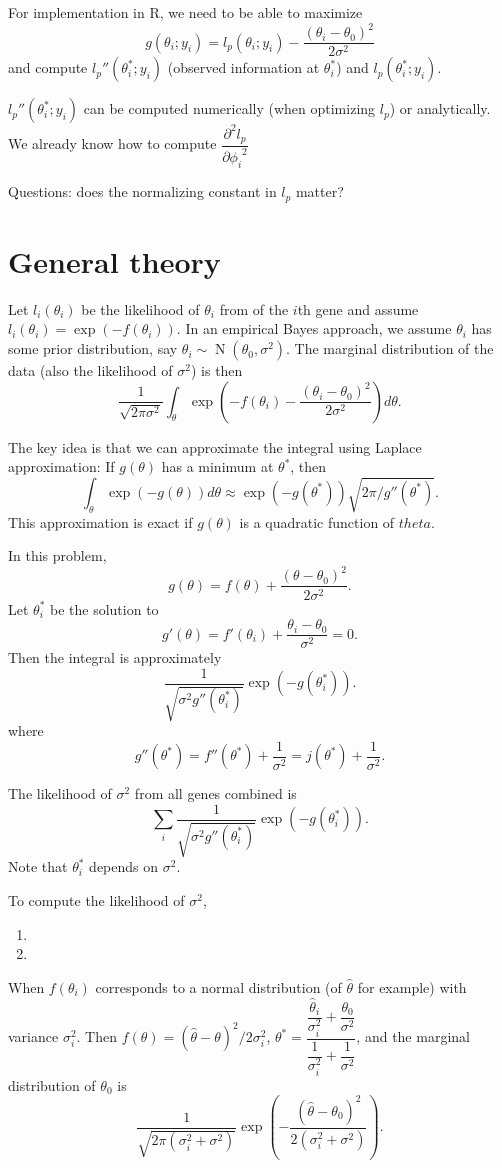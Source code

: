 \documentclass[letterpaper, 12pt]{article}
\DeclareMathOperator{\N}{N}
\newcommand{\ddpp}[2]{ \dfrac{\partial^2 #1}{ {\partial #2}^2}}
\begin{document}
For implementation in R, we need to be able to maximize
\[ g(\theta_i; y_i) = l_p(\theta_i; y_i) - \dfrac{(\theta_i - \theta_0)^2}{2 \sigma^2} \]
and compute $l_p''(\theta_i^*; y_i)$ (observed information at $\theta_i^*$) and
$l_p(\theta_i^*; y_i)$.

$l_p''(\theta_i^*; y_i)$ can be computed numerically (when optimizing $l_p$)
or analytically.  We already know how to compute $\ddpp{l_p}{\phi_i}$

Questions: does the normalizing constant in $l_p$ matter?


\newpage
\section*{General theory}
Let $l_i(\theta_i)$ be the likelihood of $\theta_i$ from of the $i$th gene and
assume $l_i(\theta_i) = \exp(-f(\theta_i))$. In an empirical Bayes approach,
we assume $\theta_i$ has some prior distribution, say $\theta_i \sim
\N(\theta_0, \sigma^2)$. The marginal distribution of the data (also the
likelihood of $\sigma^2$) is then \[ \dfrac{1}{ \sqrt{2 \pi
\sigma^2}}\int_\theta \exp\left(-f(\theta_i) - \dfrac{(\theta_i -
\theta_0)^2}{2 \sigma^2} \right) d\theta.  \]


The key idea is that we can approximate the integral using Laplace approximation:
If $g(\theta)$ has a minimum at $\theta^*$, then
\[ \int_\theta \exp(-g(\theta)) d\theta \approx  \exp(-g(\theta^*)) \sqrt{2 \pi /
g''(\theta^*)}. \]
This approximation is exact if $g(\theta)$ is a quadratic function of $theta$.


In this problem,
\[ g(\theta) = f(\theta) + \dfrac{(\theta - \theta_0)^2}{2 \sigma^2}. \]
Let $\theta_i^*$ be the solution to
\[ g'(\theta) = f'(\theta_i) + \dfrac{\theta_i - \theta_0}{\sigma^2} =0. \]
Then the integral is approximately
 \[ \dfrac{1}{ \sqrt{\sigma^2 g''(\theta_i^*)}} \exp\left(-g(\theta_i^*)\right). \]
where
 \[ g''(\theta^*) = f''(\theta^*) + \dfrac{1}{\sigma^2} = j(\theta^*) +
 \dfrac{1}{\sigma^2}. \]

 The likelihood of $\sigma^2$ from all genes combined is \[ \sum_i
 \dfrac{1}{ \sqrt{\sigma^2 g''(\theta_i^*)}}
 \exp\left(-g(\theta_i^*)\right). \]
 Note that $\theta_i^*$ depends on $\sigma^2$.

 To compute the likelihood of $\sigma^2$,
 \begin{enumerate}
     \item
     \item
 \end{enumerate}


When $f(\theta_i)$ corresponds to a normal distribution (of $\hat\theta$ for
example) with variance $\sigma_i^2$.  Then  $f(\theta) = (\hat\theta -
\theta)^2/2 \sigma_i^2$, $\theta^* = \dfrac{\dfrac{\hat\theta_i}{\sigma_i^2} +
\dfrac{\theta_0}{\sigma^2}}{\dfrac{1}{\sigma_i^2} + \dfrac{1}{\sigma^2}}$,
and the marginal distribution of $\theta_0$ is \[ \dfrac{1}{  \sqrt{2 \pi
(\sigma_i^2+\sigma^2)}} \exp\left(-
\dfrac{(\hat\theta-\theta_0)^2}{2(\sigma_i^2+\sigma^2)} \right). \]


\end{document}
